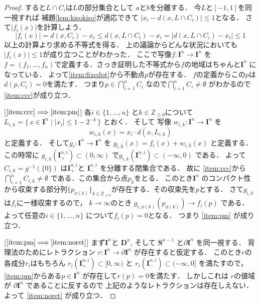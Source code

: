 \documentclass[leqno, a4paper, 12pt]{jsarticle}
\newcommand{\To}{\Longrightarrow}
\newcommand{\zz}{\mathbb{Z}}
\newcommand{\mydisc}[1]{\mathbf{D}^{#1}}
\newcommand{\mysphere}[1]{\mathbf{S}^{#1}}
\newcommand{\mycube}[1]{\mathbf{I}^{n}}
\newcommand{\mycubesidep}[2]{\mathbf{I}^{#1, #2}_{+}}
\newcommand{\mycubesidem}[2]{\mathbf{I}^{#1, #2}_{-}}
\newcommand{\mycubebd}[1]{\partial\mathbf{I}^{n}}
\begin{document}
\begin{proof}
すると$L\cap C_{i}$は$L$の部分集合として
$a$と$b$を分離する．
今$L$と$[-1, 1]$を同一視すれば
補題\ref{lem:kisokiso}が適応できて
$|x_{i}-d(x, L\cap C_{i})|\le 1$となる．
さて$|f_{i}(x)|$を計算しよう．
\[
|f_{i}(x)|=d(x, C_{i})-x_{i}
\le d(x, L\cap C_{i})-x_{i}=|d(x, L\cap C_{i})-x_{i}|\le 1
\]
以上の計算より求める不等式を得る．
上の議論からどんな状況においても
$|f_{i}(x)|\le 1$が成り立つことがわかった．
ここで写像$f\colon \mycube{n}\to \mycube{n}$
を$f=(f_{1}, \dots, f_{n})$で定義する．さっき証明した不等式から$f$の地域はちゃんと$\mycube{n}$
になっている．
よって\ref{item:fixedpt}から不動点$p$が存在する．
$f$の定義からこの$p$は
$d(p, C_{i})=0$を満たす．
つまり$p\in \bigcap_{i=1}^{n}C_{i}$
なので$\bigcap_{i=1}^{n}C_{i}\neq \emptyset$
がわかるので
\ref{item:ccc}が成り立つ．



[$\ref{item:ccc}\To \ref{item:pm}$]
各$i\in \{1, \dots, n\}$
と$k\in\zz_{\ge 0}$について
$L_{i, k}=\{\, x\in \mycube{n}\mid |x_{i}|\le 1-2^{-k}\, \}$
とおく．
そして
写像
$w_{i, k}\colon\mycube{n}\to \mycube{n}$
を
\[
w_{i, k}(x)=
x_{i}\cdot d(x, L_{i, k})
\]
と定義する．
そして$g_{i}\colon \mycube{n}\to \mycube{n}$
を
$g_{i, k}(x)=f_{i}(x)+w_{i, k}(x)$
と定義する．
この時常に
$g_{i, k}(\mycubesidep{n}{i})\subset (0, \infty)$
で$g_{i, k}(\mycubesidem{n}{i})\subset (-\infty, 0)$
である．
よって
$C_{i, k}=g^{-1}(\{0\})$
は$\mycubesidep{n}{i}$と
$\mycubesidem{n}{i}$
を分離する閉集合である．
故に
\ref{item:ccc}から
$\bigcap_{i=1}^{n}C_{i, k}\neq \emptyset$
である．この集合から点$p_{k}$をとる．
このとき$\mycube{n}$
のコンパクト性から収束する部分列$\{p_{\phi(k)}\}_{k\in \zz_{\ge 0}}$が存在する．その収束先を$p$とする．
さて$g_{i, k}$は$f_{i}$に一様収束するので，
$k\to \infty$のとき
$g_{i, \phi(k)}(p_{\phi(k)})\to f_{i}(p)$
である．
よって任意の$i\in \{1, \dots, n\}$
について$f_{i}(p)=0$となる．
つまり
\ref{item:pm}
が成り立つ．


[$\ref{item:pm}\To \ref{item:noret}$]
まず$\mycube{n}$と
$\mydisc{n}$, 
そして
$\mysphere{n-1}$
と$\mycubebd{n}$
を同一視する．
背理法のためにレトラクション
$r\colon \mycube{n}\to \mycubebd{n}$
が存在すると仮定する．
このとき$r$の各成分$r_{i}$はもちろん
$r_{i}(\mycubesidep{n}{i})\subset [0, \infty)$
と
$r_{i}(\mycubesidem{n}{i})\subset (-\infty, 0]$
を満たすので，\ref{item:pm}からある$p\in \mycube{n}$
が存在して$r(p)=0$を満たす．
しかしこれは
$r$の値域が
$\mycubebd{n}$
であることに反するので
上記のようなレトラクションは存在しえない．
よって
\ref{item:noret}
が成り立つ．
\end{proof}
\end{document}
